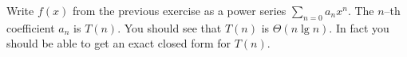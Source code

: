   Write $f(x)$ from the previous exercise as a power series $\sum_{n=0}a_n x^n$.
  The $n$--th coefficient $a_n$ is $T(n)$.
  You should see that $T(n)$ is $\Theta(n \lg n)$.
  In fact you should be able to get an exact closed form for $T(n)$.


